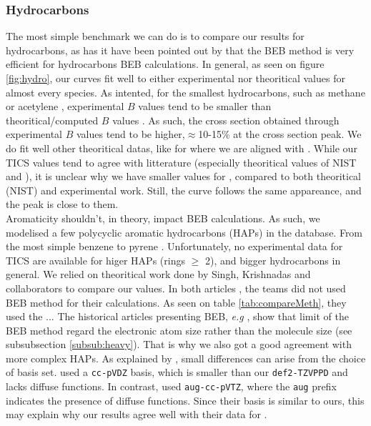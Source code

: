 \documentclass[article,preview]{planetary}
\begin{document}
\subsubsection{Hydrocarbons}
The most simple benchmark we can do is to compare our results for hydrocarbons, as has it have been pointed out by \textcite{hwangNewModelElectronimpact1996} that the BEB method is very efficient for hydrocarbons BEB calculations. In general, as seen on figure \ref{fig:hydro}, our curves fit well to either experimental nor theoritical values for almost every species. As intented, for the smallest hydrocarbons, such as methane  or acetylene , experimental $B$ values tend to be smaller than theoritical/computed $B$ values \parencites{aliElectronimpactTotalIonization1997,hwangNewModelElectronimpact1996}. As such, the cross section obtained through experimental $B$ values tend to be higher,$ \approx$10-15\% at the cross section peak.
We do fit well other theoritical datas, like for  where we are aligned with \textcite{linstromNISTChemistryWebBook2001,gachesAstrochemistryLowenergyElectron2024}. While our  TICS values tend to agree with litterature (especially theoritical values of NIST and \cite{gachesAstrochemistryLowenergyElectron2024}), it is unclear why we have smaller values for , compared to both theoritical (NIST) and experimental \parencite{fresnetDynamicsBreakdownDelay2002} work. Still, the curve follows the same appareance, and the peak is close to them.\\
Aromaticity shouldn't, in theory, impact BEB calculations. As such, we modelised a few polycyclic aromatic hydrocarbons (HAPs) in the database. From the most simple benzene  to pyrene . Unfortunately, no experimental data for TICS are available for higer HAPs (rings $\geq$ 2), and bigger hydrocarbons in general. We relied on theoritical work done by Singh, Krishnadas and collaborators to compare our values. In both articles \parencite{krishnadasCalculationElectronimpactIonization2024,singhElectronScatteringCross2020}, the teams did not used BEB method for their calculations. As seen on table \ref{tab:compareMeth}, they used the ...
The historical articles presenting BEB, \textit{e.g} \textcite{hwangNewModelElectronimpact1996,kimBinaryencounterdipoleModelElectronimpact1994}, show that limit of the BEB method regard the electronic atom size rather than the molecule size (see subsubsection \ref{subsub:heavy}). That is why we also got a good agreement with more complex HAPs. As explained by \textcite{krishnadasCalculationElectronimpactIonization2024}, small differences can arise from the choice of basis set. \textcite{singhElectronScatteringCross2020} used a \verb|cc-pVDZ| basis, which is smaller than our \verb|def2-TZVPPD| and lacks diffuse functions. In contrast, \textcite{krishnadasCalculationElectronimpactIonization2024} used \verb|aug-cc-pVTZ|, where the \verb|aug| prefix indicates the presence of diffuse functions. Since their basis is similar to ours, this may explain why our results agree well with their data for . \\%
\end{document}
